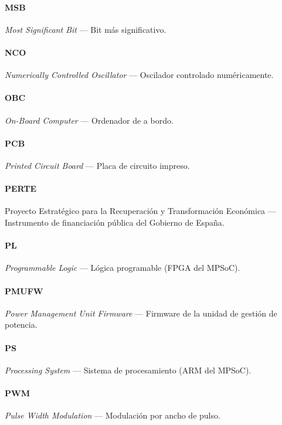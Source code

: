 \paragraph{MSB} \textit{Most Significant Bit} --- Bit más significativo.

\paragraph{NCO} \textit{Numerically Controlled Oscillator} --- Oscilador controlado numéricamente.

\paragraph{OBC} \textit{On-Board Computer} --- Ordenador de a bordo.

\paragraph{PCB} \textit{Printed Circuit Board} --- Placa de circuito impreso.

\paragraph{PERTE} Proyecto Estratégico para la Recuperación y Transformación Económica --- Instrumento de financiación pública del Gobierno de España.

\paragraph{PL} \textit{Programmable Logic} --- Lógica programable (FPGA del MPSoC).

\paragraph{PMUFW} \textit{Power Management Unit Firmware} --- Firmware de la unidad de gestión de potencia.

\paragraph{PS} \textit{Processing System} --- Sistema de procesamiento (ARM del MPSoC).

\paragraph{PWM} \textit{Pulse Width Modulation} --- Modulación por ancho de pulso.

